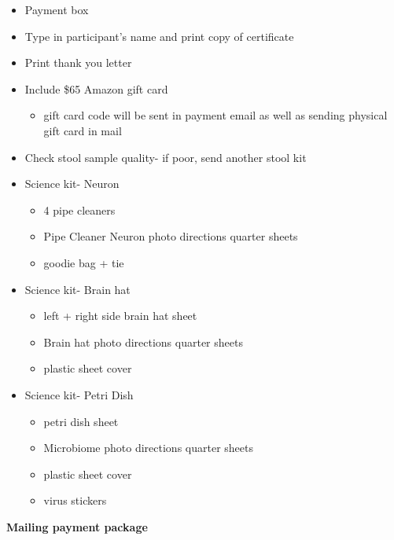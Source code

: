 \documentclass[
]{book}
\providecommand{\tightlist}{%
  \setlength{\itemsep}{0pt}\setlength{\parskip}{0pt}}
\begin{document}
\begin{itemize}
\tightlist
\item
  Payment box
\item
  Type in participant's name and print copy of certificate
\item
  Print thank you letter
\item
  Include \$65 Amazon gift card

  \begin{itemize}
  \tightlist
  \item
    gift card code will be sent in payment email as well as sending physical gift card in mail
  \end{itemize}
\item
  Check stool sample quality- if poor, send another stool kit
\item
  Science kit- Neuron

  \begin{itemize}
  \tightlist
  \item
    4 pipe cleaners
  \item
    Pipe Cleaner Neuron photo directions quarter sheets
  \item
    goodie bag + tie
  \end{itemize}
\item
  Science kit- Brain hat

  \begin{itemize}
  \tightlist
  \item
    left + right side brain hat sheet
  \item
    Brain hat photo directions quarter sheets
  \item
    plastic sheet cover
  \end{itemize}
\item
  Science kit- Petri Dish

  \begin{itemize}
  \tightlist
  \item
    petri dish sheet
  \item
    Microbiome photo directions quarter sheets
  \item
    plastic sheet cover
  \item
    virus stickers
  \end{itemize}
\end{itemize}

\textbf{Mailing payment package}
\end{document}
